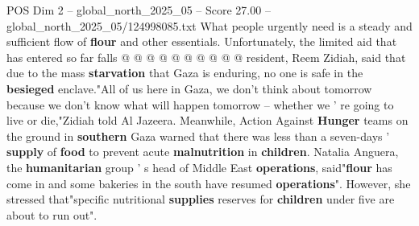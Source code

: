\begin{textsample}{POS Dim 2 – global\_north\_2025\_05 – Score 27.00 – global\_north\_2025\_05/124998085.txt}
What people urgently need is a steady and sufficient flow of \textbf{flour} and other essentials.
Unfortunately, the limited aid that has entered so far falls @ @ @ @ @ @ @ @ @ @ resident, Reem Zidiah, said that due to the mass \textbf{starvation} that Gaza is enduring, no one is safe in the \textbf{besieged} enclave."All of us here in Gaza, we don't think about tomorrow because we don't know what will happen tomorrow -- whether we ' re going to live or die,"Zidiah told Al Jazeera.
Meanwhile, Action Against \textbf{Hunger} teams on the ground in \textbf{southern} Gaza warned that there was less than a seven-days ' \textbf{supply} of \textbf{food} to prevent acute \textbf{malnutrition} in \textbf{children}.
Natalia Anguera, the \textbf{humanitarian} group ' s head of Middle East \textbf{operations}, said"\textbf{flour} has come in and some bakeries in the south have resumed \textbf{operations}".
However, she stressed that"specific nutritional \textbf{supplies} reserves for \textbf{children} under five are about to run out".

\end{textsample}
